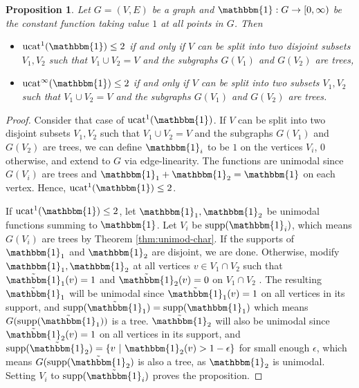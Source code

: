 \documentclass[11pt]{article}
\DeclareMathOperator{\ucat}{ucat}
\newtheorem{prp}[thm]{Proposition}
\newcommand{\supp}{\text{supp}}
\begin{document}
\begin{prp}
\label{prp:k2p}
Let $G = (V,E)$ be a graph and $
\mathbbm{1}: G \rightarrow [0,\infty)$ be the constant function taking value $1$ at all points in $G$. Then 
\begin{itemize}
\item $\ucat^1(\mathbbm{1}) \leq 2$ if and only if $V$ can be split into two disjoint subsets $V_1, V_2$ such that $V_1 \cup V_2 = V$ and the subgraphs $G(V_1)$ and $G(V_2)$ are trees,
\item $\ucat^{\infty}(\mathbbm{1}) \leq 2$ if and only if $V$ can be split into two subsets $V_1, V_2$ such that $V_1 \cup V_2 = V$ and the subgraphs $G(V_1)$ and $G(V_2)$ are trees.
\end{itemize}
\end{prp}
\begin{proof}
Consider that case of $\ucat^1(\mathbbm{1})$. If $V$ can be split into two disjoint subsets $V_1, V_2$ such that $V_1 \cup V_2 = V$ and the subgraphs $G(V_1)$ and $G(V_2)$ are trees, we can define $\mathbbm{1}_i$ to be $1$ on the vertices $V_i$, $0$ otherwise, and extend to $G$ via edge-linearity. The functions are unimodal since $G(V_i)$ are trees and $\mathbbm{1}_1+\mathbbm{1}_2 = \mathbbm{1}$ on each vertex. Hence, $\ucat^1(\mathbbm{1}) \leq 2$.

If $\ucat^1(\mathbbm{1}) \leq 2$, let $\mathbbm{1}_1, \mathbbm{1}_2$ be unimodal functions summing to $\mathbbm{1}$. Let $V_i$ be $\supp(\mathbbm{1}_i)$, which means $G(V_i)$ are trees by Theorem \ref{thm:unimod-char}. If the supports of $\mathbbm{1}_1$ and $\mathbbm{1}_2$ are disjoint, we are done. Otherwise, modify $\mathbbm{1}_1, \mathbbm{1}_2$ at all vertices $v \in V_1\cap V_2$ such that $\tilde{\mathbbm{1}}_1(v) = 1$ and $\tilde{\mathbbm{1}}_2(v) = 0$ on $V_1\cap V_2$ . The resulting $\tilde{\mathbbm{1}}_1$ will be unimodal since $\tilde{\mathbbm{1}}_1(v) = 1$ on all vertices in its support, and $\supp(\tilde{\mathbbm{1}}_1) = \supp(\mathbbm{1}_1)$ which means $G(\supp(\tilde{\mathbbm{1}}_1))$ is a tree. $\tilde{\mathbbm{1}}_2$ will also be unimodal since $\tilde{\mathbbm{1}}_2(v) = 1$ on all vertices in its support, and $\supp(\tilde{\mathbbm{1}}_2) = \{ v \ | \ \mathbbm{1}_2(v) > 1-\epsilon \}$ for small enough $\epsilon$, which means $G(\supp(\tilde{\mathbbm{1}}_2)$ is also a tree, as $\mathbbm{1}_2$ is unimodal. Setting $V_i$ to $\supp(\tilde{\mathbbm{1}}_i)$ proves the proposition.


\end{proof}
\end{document}

